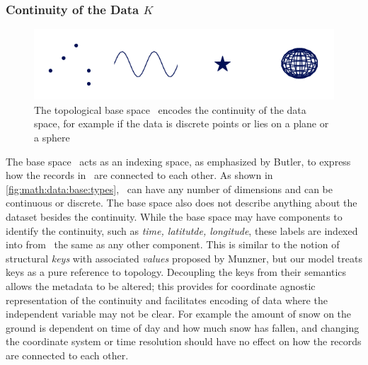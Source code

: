 \documentclass[../main.tex]{subfiles}
\begin{document}
\subsubsection{Continuity of the Data $K$} 
\label{sec:math:data:base}
\begin{figure}[H]
    \includegraphics[width=1\textwidth]{figures/math/k_different_types.png}
    \caption{The topological base space \dbase\ encodes the continuity of the data space, for example if the data is discrete points or lies on a plane or a sphere}
    \label{fig:math:data:base:types}
\end{figure}
The base space \dbase\ acts as an indexing space, as emphasized by Butler\cite{butlerVectorBundleClassesForm1992,butlerVisualizationModelBased1989}, to express how the records in \dtotal\ are connected to each other. As shown in \autoref{fig:math:data:base:types}, 
\dbase\ can have any number of dimensions and can be continuous or discrete. The base space also does not describe anything about the dataset besides the continuity. While the base space may have components to identify the continuity, such as \textit{time, latitutde, longitude}, these labels are indexed into from \dbase\ the same as any other component. This is similar to the notion of structural \textit{keys} with associated \textit{values} proposed by Munzner\cite{munznerVisualizationAnalysisDesign2014}, but our model treats keys as a pure reference to topology. Decoupling the keys from their semantics allows the metadata to be altered; this provides for coordinate agnostic representation of the continuity and facilitates encoding of data where the independent variable may not be clear. For example the amount of snow on the ground is dependent on time of day and how much snow has fallen, and changing the coordinate system or time resolution should have no effect on how the records are connected to each other. 
\end{document}
